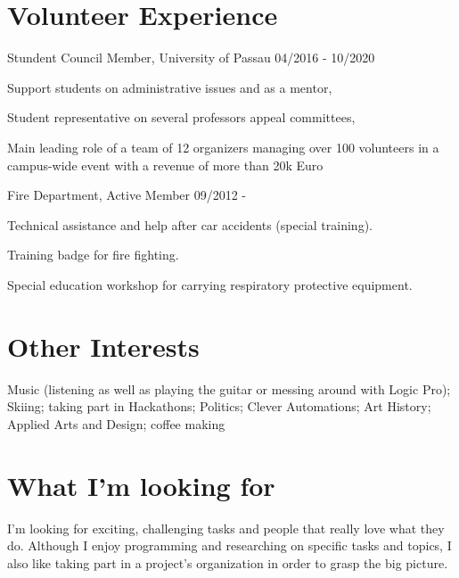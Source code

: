 \documentclass{article}
\renewenvironment{itemize}[1]{\begin{compactitem}#1}{\end{compactitem}}
\begin{document}

\section{Volunteer Experience}

\ralewaysb Stundent Council Member, \raleway University of Passau \hfill 04/2016 - 10/2020
\begin{itemize}[-]
  \item Support students on administrative issues and as a mentor, 
  \item Student representative on several professors appeal committees, 
  \item Main leading role of a team of 12 organizers managing over 100 volunteers in a campus-wide event with a revenue of more than 20k Euro 
\end{itemize}

\ralewaysb Fire Department, \raleway Active Member \hfill 09/2012 - 
\begin{itemize}[-]
  \item Technical assistance and help after car accidents (special training).
  \item Training badge for fire fighting.
  \item Special education workshop for carrying respiratory protective equipment.
\end{itemize}


\vspace{.9em}
\section{Other Interests}
Music (listening as well as playing the guitar or messing around with Logic Pro); Skiing; taking part in Hackathons; Politics; Clever Automations; Art History; Applied Arts and Design; coffee making

\vspace{.9em}
\section{What I'm looking for}
I'm looking for exciting, challenging tasks and people that really love what they do. Although I enjoy programming and researching on specific tasks and topics, I also like taking part in a project's organization in order to grasp the big picture. 
\end{document}
